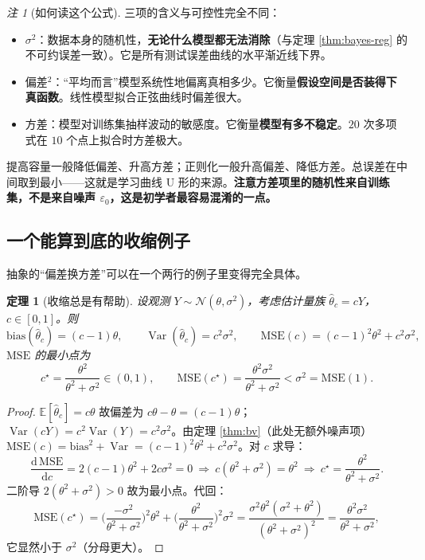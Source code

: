\documentclass[UTF8,a4paper,11pt]{ctexart}
\theoremstyle{definition}
\theoremstyle{plain}
\newtheorem{theorem}[definition]{定理}
\theoremstyle{remark}
\newtheorem{remark}[definition]{注}
\DeclareMathOperator{\Var}{Var}
\newcommand{\E}{\mathbb{E}}
\newcommand{\dd}{\mathrm{d}}
\begin{document}
\begin{remark}[如何读这个公式]
三项的含义与可控性完全不同：
\begin{itemize}
  \item $\sigma^2$：数据本身的随机性，\textbf{无论什么模型都无法消除}（与定理 \ref{thm:bayes-reg} 的不可约误差一致）。它是所有测试误差曲线的水平渐近线下界。
  \item 偏差$^2$：“平均而言”模型系统性地偏离真相多少。它衡量\textbf{假设空间是否装得下真函数}。线性模型拟合正弦曲线时偏差很大。
  \item 方差：模型对训练集抽样波动的敏感度。它衡量\textbf{模型有多不稳定}。$20$ 次多项式在 $10$ 个点上拟合时方差极大。
\end{itemize}
提高容量一般降低偏差、升高方差；正则化一般升高偏差、降低方差。总误差在中间取到最小——这就是学习曲线 U 形的来源。\textbf{注意方差项里的随机性来自训练集，不是来自噪声 $\varepsilon_0$，这是初学者最容易混淆的一点。}
\end{remark}

\subsection{一个能算到底的收缩例子}

抽象的“偏差换方差”可以在一个两行的例子里变得完全具体。

\begin{theorem}[收缩总是有帮助]\label{thm:shrink}
设观测 $Y\sim\mathcal{N}(\theta,\sigma^2)$，考虑估计量族 $\hat\theta_c=cY$，$c\in[0,1]$。则
\[
  \mathrm{bias}(\hat\theta_c)=(c-1)\theta,\qquad
  \Var(\hat\theta_c)=c^2\sigma^2,\qquad
  \mathrm{MSE}(c)=(c-1)^2\theta^2+c^2\sigma^2 ,
\]
$\mathrm{MSE}$ 的最小点为
\[
  c^\star=\frac{\theta^2}{\theta^2+\sigma^2}\in(0,1),
  \qquad
  \mathrm{MSE}(c^\star)=\frac{\theta^2\sigma^2}{\theta^2+\sigma^2}<\sigma^2=\mathrm{MSE}(1).
\]
\end{theorem}

\begin{proof}
$\E[\hat\theta_c]=c\theta$ 故偏差为 $c\theta-\theta=(c-1)\theta$；$\Var(cY)=c^2\Var(Y)=c^2\sigma^2$。由定理 \ref{thm:bv}（此处无额外噪声项）
$\mathrm{MSE}(c)=\mathrm{bias}^2+\Var=(c-1)^2\theta^2+c^2\sigma^2$。对 $c$ 求导：
\[
  \frac{\dd\,\mathrm{MSE}}{\dd c}=2(c-1)\theta^2+2c\sigma^2=0
  \ \Longrightarrow\ c(\theta^2+\sigma^2)=\theta^2\ \Longrightarrow\ c^\star=\frac{\theta^2}{\theta^2+\sigma^2}.
\]
二阶导 $2(\theta^2+\sigma^2)>0$ 故为最小点。代回：
\[
  \mathrm{MSE}(c^\star)=\Big(\frac{-\sigma^2}{\theta^2+\sigma^2}\Big)^2\theta^2+\Big(\frac{\theta^2}{\theta^2+\sigma^2}\Big)^2\sigma^2
  =\frac{\sigma^2\theta^2(\sigma^2+\theta^2)}{(\theta^2+\sigma^2)^2}=\frac{\theta^2\sigma^2}{\theta^2+\sigma^2},
\]
它显然小于 $\sigma^2$（分母更大）。
\end{proof}
\end{document}
